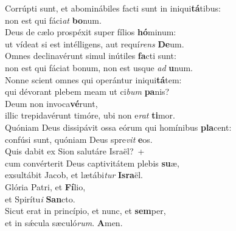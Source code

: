 \evenverse Corrúpti sunt, et abominábiles facti sunt in iniqui\textbf{tá}tibus:~\*\\
\evenverse non est qui fáci\textit{at} \textbf{bo}num.\\
\oddverse Deus de cælo prospéxit super fílios \textbf{hó}minum:~\*\\
\oddverse ut vídeat si est intélligens, aut requí\textit{rens} \textbf{De}um.\\
\evenverse Omnes declinavérunt simul inútiles \textbf{fa}cti sunt:~\*\\
\evenverse non est qui fáciat bonum, non est usque \textit{ad} \textbf{u}num.\\
\oddverse Nonne scient omnes qui operántur iniqui\textbf{tá}tem:~\*\\
\oddverse qui dévorant plebem meam ut ci\textit{bum} \textbf{pa}nis?\\
\evenverse Deum non invoca\textbf{vé}runt,~\*\\
\evenverse illic trepidavérunt timóre, ubi non e\textit{rat} \textbf{ti}mor.\\
\oddverse Quóniam Deus dissipávit ossa eórum qui homínibus \textbf{pla}cent:~\*\\
\oddverse confúsi sunt, quóniam Deus spre\textit{vit} \textbf{e}os.\\
\evenverse Quis dabit ex Sion salutáre Israël?~+\\
\evenverse  cum convérterit Deus captivitátem plebis \textbf{su}æ,~\*\\
\evenverse exsultábit Jacob, et lætábi\textit{tur} \textbf{Is}\textbf{ra}ël.\\
\oddverse Glória Patri, et \textbf{Fí}lio,~\*\\
\oddverse et Spirítu\textit{i} \textbf{San}cto.\\
\evenverse Sicut erat in princípio, et nunc, et \textbf{sem}per,~\*\\
\evenverse et in sǽcula sæculó\textit{rum}. \textbf{A}men.\\
